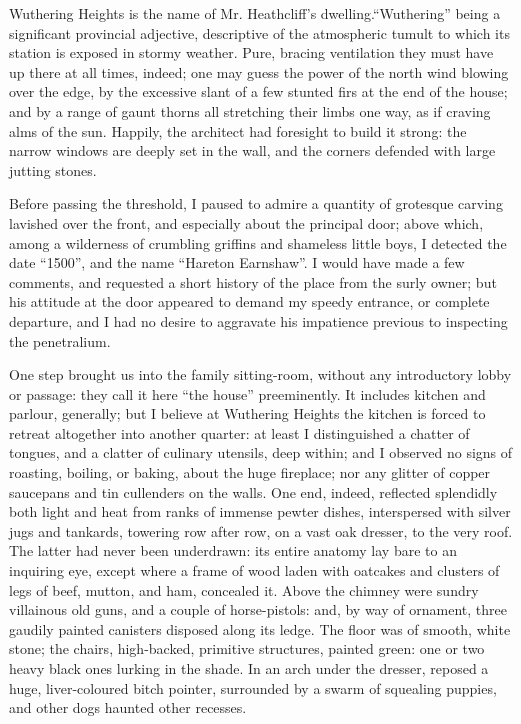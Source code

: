 \par Wuthering Heights is the name of Mr. Heathcliff's dwelling.“Wuthering” being a significant provincial adjective, descriptive of the atmospheric tumult to which its station is exposed in stormy weather. Pure, bracing ventilation they must have up there at all times, indeed; one may guess the power of the north wind blowing over the edge, by the excessive slant of a few stunted firs at the end of the house; and by a range of gaunt thorns all stretching their limbs one way, as if craving alms of the sun. Happily, the architect had foresight to build it strong: the narrow windows are deeply set in the wall, and the corners defended with large jutting stones.
\par Before passing the threshold, I paused to admire a quantity of grotesque carving lavished over the front, and especially about the principal door; above which, among a wilderness of crumbling griffins and shameless little boys, I detected the date “1500”, and the name “Hareton Earnshaw”. I would have made a few comments, and requested a short history of the place from the surly owner; but his attitude at the door appeared to demand my speedy entrance, or complete departure, and I had no desire to aggravate his impatience previous to inspecting the penetralium.
\par One step brought us into the family sitting-room, without any introductory lobby or passage: they call it here “the house” preeminently. It includes kitchen and parlour, generally; but I believe at Wuthering Heights the kitchen is forced to retreat altogether into another quarter: at least I distinguished a chatter of tongues, and a clatter of culinary utensils, deep within; and I observed no signs of roasting, boiling, or baking, about the huge fireplace; nor any glitter of copper saucepans and tin cullenders on the walls. One end, indeed, reflected splendidly both light and heat from ranks of immense pewter dishes, interspersed with silver jugs and tankards, towering row after row, on a vast oak dresser, to the very roof. The latter had never been underdrawn: its entire anatomy lay bare to an inquiring eye, except where a frame of wood laden with oatcakes and clusters of legs of beef, mutton, and ham, concealed it. Above the chimney were sundry villainous old guns, and a couple of horse-pistols: and, by way of ornament, three gaudily painted canisters disposed along its ledge. The floor was of smooth, white stone; the chairs, high-backed, primitive structures, painted green: one or two heavy black ones lurking in the shade. In an arch under the dresser, reposed a huge, liver-coloured bitch pointer, surrounded by a swarm of squealing puppies, and other dogs haunted other recesses.
